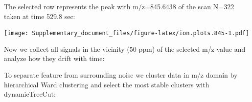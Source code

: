 \documentclass[]{article}
\newenvironment{Shaded}{\begin{snugshade}}{\end{snugshade}}
\newcommand{\KeywordTok}[1]{\textcolor[rgb]{0.13,0.29,0.53}{\textbf{#1}}}
\newcommand{\FloatTok}[1]{\textcolor[rgb]{0.00,0.00,0.81}{#1}}
\newcommand{\StringTok}[1]{\textcolor[rgb]{0.31,0.60,0.02}{#1}}
\newcommand{\OperatorTok}[1]{\textcolor[rgb]{0.81,0.36,0.00}{\textbf{#1}}}
\newcommand{\NormalTok}[1]{#1}
\begin{document}
The selected row represents the peak with m/z=845.6438 of the scan N=322
taken at time 529.8 sec:

\begin{Shaded}
\end{Shaded}

\texttt{[image: Supplementary\_document\_files/figure-latex/ion.plots.845-1.pdf]}

Now we collect all signals in the vicinity (50 ppm) of the selected m/z
value and analyze how they drift with time:

\begin{Shaded}
\end{Shaded}

To separate feature from surrounding noise we cluster data in m/z domain
by hierarchical Ward clustering and select the most stable clusters with
dynamicTreeCut:
\end{document}
